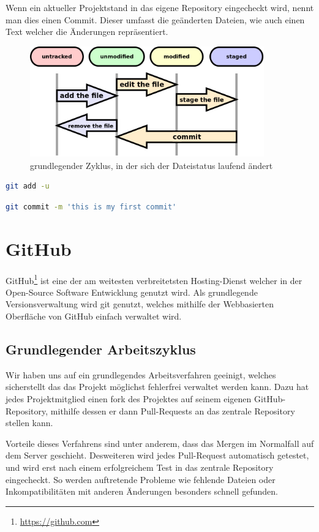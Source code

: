 Wenn ein aktueller Projektstand in das eigene Repository eingecheckt wird, nennt man dies einen Commit. Dieser umfasst die ge\"anderten Dateien, wie auch einen Text welcher die \"Anderungen repr\"asentiert.

\begin{figure}[h]
\centering
\includegraphics[width=0.9\textwidth]{./media/images/development/git_file_status_livecycle.png}
\caption{grundlegender Zyklus, in der sich der Dateistatus laufend \"andert}
\label{git_file_status_livecycle}
\end{figure}



\begin{lstlisting}[language=bash]
git add -u
\end{lstlisting}


\begin{lstlisting}[language=bash]
git commit -m 'this is my first commit'
\end{lstlisting}

\section{GitHub}

GitHub\footnote{\url{https://github.com}} ist eine der am weitesten verbreitetsten Hosting-Dienst welcher in der Open-Source Software Entwicklung genutzt wird. Als grundlegende Versionsverwaltung wird git genutzt, welches mithilfe der Webbasierten Oberfl\"ache von GitHub einfach verwaltet wird.

\subsection{Grundlegender Arbeitszyklus}

Wir haben uns auf ein grundlegendes Arbeitsverfahren geeinigt, welches sicherstellt das das Projekt m\"oglichst fehlerfrei verwaltet werden kann. Dazu hat jedes Projektmitglied einen fork des Projektes auf seinem eigenen GitHub-Repository, mithilfe dessen er dann Pull-Requests an das zentrale Repository stellen kann.

Vorteile dieses Verfahrens sind unter anderem, dass das Mergen im Normalfall auf dem Server geschieht. Desweiteren wird jedes Pull-Request automatisch getestet, und wird erst nach einem erfolgreichem Test in das zentrale Repository eingecheckt. So werden auftretende Probleme wie fehlende Dateien oder Inkompatibilit\"aten mit anderen \"Anderungen besonders schnell gefunden.
